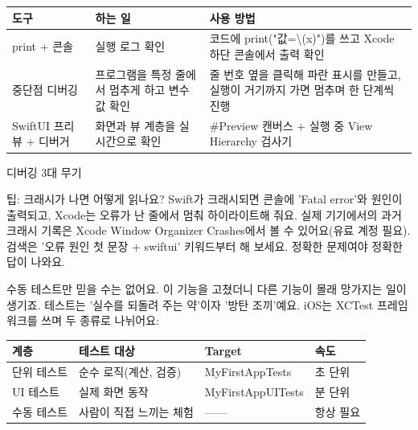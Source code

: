 


\begin{center}
\begin{tabularx}{\linewidth}{|X|X|X|}
\hline
\textbf{도구} & \textbf{하는 일} & \textbf{사용 방법} \tabularnewline
\hline
print + 콘솔 & 실행 로그 확인 & 코드에 print("값=\textbackslash{}(x)")를 쓰고 Xcode 하단 콘솔에서 출력 확인 \tabularnewline
중단점 디버깅 & 프로그램을 특정 줄에서 멈추게 하고 변수 값 확인 & 줄 번호 옆을 클릭해 파란 표시를 만들고, 실행이 거기까지 가면 멈추며 한 단계씩 진행 \tabularnewline
SwiftUI 프리뷰 + 디버거 & 화면과 뷰 계층을 실시간으로 확인 & \#Preview 캔버스 + 실행 중 View Hierarchy 검사기 \tabularnewline
\hline
\end{tabularx}
\end{center}

\begin{center}\small\color{gray}디버깅 3대 무기\end{center}

\begin{tcbinfo}{팁: 크래시가 나면 어떻게 읽나요?}
Swift가 크래시되면 콘솔에 'Fatal error'와 원인이 출력되고, Xcode는 오류가 난 줄에서 멈춰 하이라이트해 줘요. 실제 기기에서의 과거 크래시 기록은 Xcode Window Organizer Crashes에서 볼 수 있어요(유료 계정 필요). 검색은 '오류 원인 첫 문장 + swiftui' 키워드부터 해 보세요. 정확한 문제여야 정확한 답이 나와요.

\end{tcbinfo}


수동 테스트만 믿을 수는 없어요. 이 기능을 고쳤더니 다른 기능이 몰래 망가지는 일이 생기죠. 테스트는 '실수를 되돌려 주는 약'이자 '방탄 조끼'예요. iOS는 XCTest 프레임워크를 쓰며 두 종류로 나뉘어요:

\begin{center}
\begin{tabularx}{\linewidth}{|X|X|X|X|}
\hline
\textbf{계층} & \textbf{테스트 대상} & \textbf{Target} & \textbf{속도} \tabularnewline
\hline
단위 테스트 & 순수 로직(계산, 검증) & MyFirstAppTests & 초 단위 \tabularnewline
UI 테스트 & 실제 화면 동작 & MyFirstAppUITests & 분 단위 \tabularnewline
수동 테스트 & 사람이 직접 느끼는 체험 & —— & 항상 필요 \tabularnewline
\hline
\end{tabularx}
\end{center}


